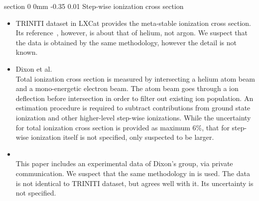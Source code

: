 \documentclass[11pt]{article}
\makeatletter
\renewcommand{\section}{\@startsection
{section}%
{0}%
{0mm}%
{-0.35\baselineskip}%
{0.01\baselineskip}%
{\normalfont\Large\bfseries\color{myTan}}}%
\makeatother
\begin{document}
\section{Step-wise ionization cross section}
\begin{itemize}
\item TRINITI dataset in LXCat provides the meta-stable ionization cross section.
Its reference~\cite{Dixon1976}, however, is about that of helium, not argon.
We suspect that the data is obtained by the same methodology, however the detail is not known.
\item Dixon et al.\cite{Dixon1976}\\
Total ionization cross section is measured by intersecting a helium atom beam and a mono-energetic electron beam.
The atom beam goes through a ion deflection before intersection in order to filter out existing ion population.
An estimation procedure is required to subtract contributions from ground state ionization and other higher-level step-wise ionizations.
While the uncertainty for total ionization cross section is provided as maximum $6\%$,
that for step-wise ionization itself is not specified, only suspected to be larger.
\item \cite{Ton-That1977}\\
This paper includes an experimental data of Dixon's group, via private communication.
We suspect that the same methodology in \cite{Dixon1976} is used.
The data is not identical to TRINITI dataset, but agrees well with it.
Its uncertainty is not specified.
\end{itemize}

\appendix



\end{document}

